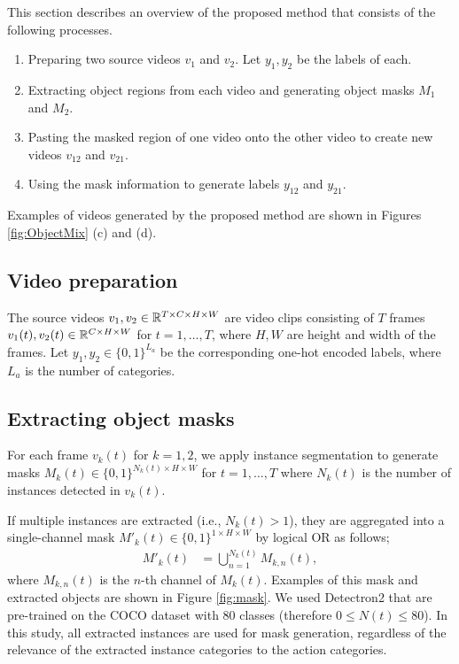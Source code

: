 This section describes an overview of the proposed method that
consists of the following processes.
\begin{enumerate}
    \item Preparing two source videos $v_1$ and $v_2$. Let $y_1, y_2$ be the labels of each.
    \item Extracting object regions from each video and generating object masks $M_1$ and $M_2$.
    \item Pasting the masked region of one video onto the other video to create new videos $v_{12}$ and $v_{21}$.
    \item Using the mask information to generate labels $y_{12}$ and $y_{21}$.
\end{enumerate}
Examples of videos generated by the proposed method are shown in Figures \ref{fig:ObjectMix} (c) and (d).


\subsection{Video preparation}


The source videos $v_1, v_2 \in \mathbb{R}^{T \times C \times H \times W}$ are video clips consisting of
$T$ frames $v_1(t), v_2(t) \in \mathbb{R}^{C \times H \times W}$ for $t=1,\ldots,T$,
where $H, W$ are height and width of the frames.
Let $y_1, y_2 \in \{0, 1\}^{L_a}$ be the corresponding one-hot encoded labels,
where $L_a$ is the number of categories.


\subsection{Extracting object masks}

For each frame $v_k(t)$ for $k=1,2$, we apply instance segmentation 
to generate masks $M_k(t) \in \{0, 1\}^{N_k(t) \times H \times W}$ for $t=1,\ldots,T$
where $N_k(t)$ is the number of instances detected in $v_k(t)$.

If multiple instances are extracted (i.e., $N_k(t) > 1$),
they are aggregated into a single-channel mask $M'_k(t) \in \{0, 1\}^{1 \times H \times W}$
by logical OR as follows;
\begin{align}
    M'_k(t) &= \bigcup_{n=1}^{N_k(t)} M_{k,n}(t),
\end{align}
where $M_{k,n}(t)$ is the $n$-th channel of $M_k(t)$.
Examples of this mask and extracted objects are shown in Figure \ref{fig:mask}.
We used Detectron2 \cite{wu2019detectron2} that are 
pre-trained on the COCO \cite{MSCOCO} dataset with 80 classes
(therefore $0 \le N(t) \le 80$).
In this study, all extracted instances are used for mask generation,
regardless of the relevance of the extracted instance categories to the action categories.



